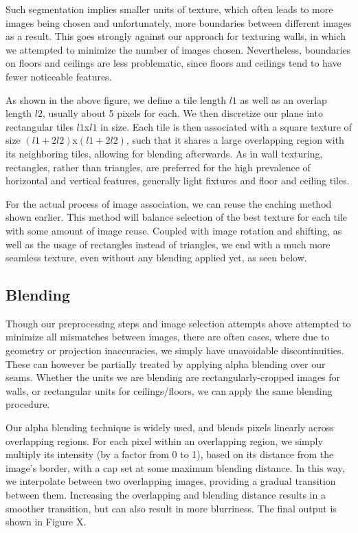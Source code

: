 \documentclass[10pt,twocolumn,letterpaper]{article}
\begin{document}
Such segmentation implies smaller units of texture, which often leads
to more images being chosen and unfortunately, more boundaries between
different images as a result. This goes strongly against our approach
for texturing walls, in which we attempted to minimize the number of
images chosen. Nevertheless, boundaries on floors and ceilings are
less problematic, since floors and ceilings tend to have fewer
noticeable features.

As shown in the above figure, we define a tile length $l1$ as well as
an overlap length $l2$, usually about 5 pixels for each. We then
discretize our plane into rectangular tiles $l1$x$l1$ in size. Each
tile is then associated with a square texture of size
$(l1+2l2)$x$(l1+2l2)$, such that it shares a large overlapping region
with its neighboring tiles, allowing for blending afterwards. As in
wall texturing, rectangles, rather than triangles, are preferred for
the high prevalence of horizontal and vertical features, generally
light fixtures and floor and ceiling tiles.

For the actual process of image association, we can reuse the caching
method shown earlier. This method will balance selection of the best
texture for each tile with some amount of image reuse. Coupled with
image rotation and shifting, as well as the usage of rectangles
instead of triangles, we end with a much more seamless texture, even
without any blending applied yet, as seen below.

\subsection{Blending}
Though our preprocessing steps and image selection attempts above
attempted to minimize all mismatches between images, there are often
cases, where due to geometry or projection inaccuracies, we simply
have unavoidable discontinuities. These can however be partially
treated by applying alpha blending over our seams.  Whether the units
we are blending are rectangularly-cropped images for walls, or
rectangular units for ceilings/floors, we can apply the same blending
procedure.

Our alpha blending technique is widely used, and blends pixels
linearly across overlapping regions. For each pixel within an
overlapping region, we simply multiply its intensity (by a factor from
0 to 1), based on its distance from the image's border, with a cap set
at some maximum blending distance. In this way, we interpolate between
two overlapping images, providing a gradual transition between
them. Increasing the overlapping and blending distance results in a
smoother transition, but can also result in more blurriness. The final
output is shown in Figure X.


{\small   }
\end{document}
